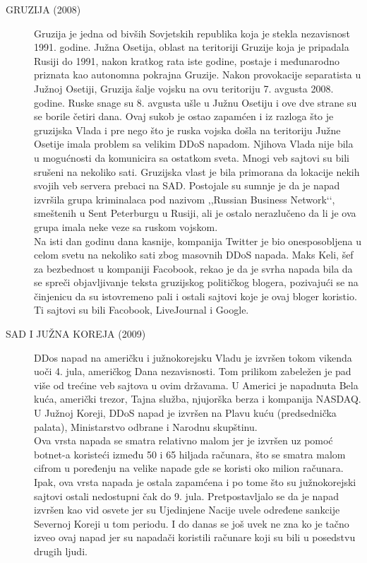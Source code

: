 \documentclass[a4paper]{article}
\theoremstyle{break}
\begin{document}
{\begin{description}
\item [GRUZIJA (2008)] Gruzija je jedna od bivših Sovjetskih republika koja je stekla nezavisnost 1991. godine. Južna Osetija, oblast na teritoriji Gruzije koja je pripadala Rusiji do 1991, nakon kratkog rata iste godine, postaje i međunarodno priznata kao autonomna pokrajna Gruzije. Nakon provokacije separatista u Južnoj Osetiji, Gruzija šalje vojsku na ovu teritoriju 7. avgusta 2008. godine. Ruske snage su 8. avgusta ušle u Južnu Osetiju i ove dve strane su se borile četiri dana. Ovaj sukob je ostao zapamćen i iz razloga što je gruzijska Vlada i pre nego što je ruska vojska došla na teritoriju Južne Osetije imala problem sa velikim DDoS napadom. Njihova Vlada nije bila u mogućnosti da komunicira sa ostatkom sveta. Mnogi veb sajtovi su bili srušeni na nekoliko sati. Gruzijska vlast je bila primorana da lokacije nekih svojih veb servera prebaci na SAD. Postojale su sumnje je da je napad izvršila grupa kriminalaca pod nazivom ,,Russian Business Network‘‘, smeštenih u Sent Peterburgu u Rusiji, ali je ostalo nerazlučeno da li je ova grupa imala neke veze sa ruskom vojskom.
\\Na isti dan godinu dana kasnije, kompanija Twitter je bio onesposobljena u celom svetu na nekoliko sati zbog masovnih DDoS napada. Maks Keli, šef za bezbednost u kompaniji Facobook, rekao je da je svrha napada bila da se spreči objavljivanje teksta gruzijskog političkog blogera, pozivajući se na činjenicu da su istovremeno pali i ostali sajtovi koje je ovaj bloger koristio. Ti sajtovi su bili Facobook, LiveJournal i Google.     
\item [SAD I JUŽNA KOREJA (2009)] DDos napad na američku i \linebreak južnokorejsku Vladu je izvršen tokom vikenda uoči 4. jula, američkog Dana nezavisnosti. Tom prilikom zabeležen je pad više od trećine veb sajtova u ovim državama. U Americi je napadnuta Bela kuća, američki trezor, Tajna služba, njujorška berza i kompanija NASDAQ. U Južnoj Koreji, DDoS napad je izvršen na Plavu kuću (predsednička palata), Ministarstvo odbrane i Narodnu skupštinu.
\\Ova vrsta napada se smatra relativno malom jer je izvršen uz pomoć botnet-a koristeći između 50 i 65 hiljada računara, što se smatra malom cifrom u poređenju na velike napade gde se koristi oko milion računara. Ipak, ova vrsta napada je ostala zapamćena i po tome što su južnokorejski sajtovi ostali nedostupni čak do 9. jula. Pretpostavljalo se da je napad izvršen kao vid osvete jer su Ujedinjene Nacije uvele određene sankcije Severnoj Koreji u tom periodu. I do danas se još uvek ne zna ko je tačno izveo ovaj napad jer su napadači koristili računare koji su bili u posedstvu drugih ljudi.    


\end{description}}
\end{document}
